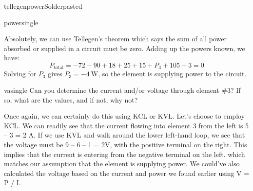 \begin{mainquestion}{tellegenpower}{Solderpasted}
\begin{partquestion}{powersingle}
\begin{answer}
Absolutely, we can use Tellegen’s theorem which says the sum of all power absorbed or supplied in a circuit must be zero.  Adding up the powers known, we have:
\[
P_{\text{total}}=-72-90+18+25+15+P_3+105+3=0
\]
Solving for $P_3$ gives $P_3=\qty{-4}{\watt}$, so the element is supplying power to the circuit. 

\end{answer}
\end{partquestion}

\begin{partquestion}{vasingle}
{Can you determine the current and/or voltage through element \#3?  If so, what are the values, and if not, why not?}

\begin{answer}
Once again, we can certainly do this using KCL or KVL.  Let’s choose to employ KCL. We can readily see that the current flowing into element 3 from the left is 5 – 3 = 2 A.  If we use KVL and walk around the lower left-hand loop, we see that the voltage must be 9 – 6 – 1 = 2V, with the positive terminal on the right. This implies that the current is entering from the negative terminal on the left. which matches our assumption that the element is supplying power. We could’ve also calculated the voltage based on the current and power we found earlier using V = P / I.
\end{answer}
\end{partquestion}

\end{mainquestion}